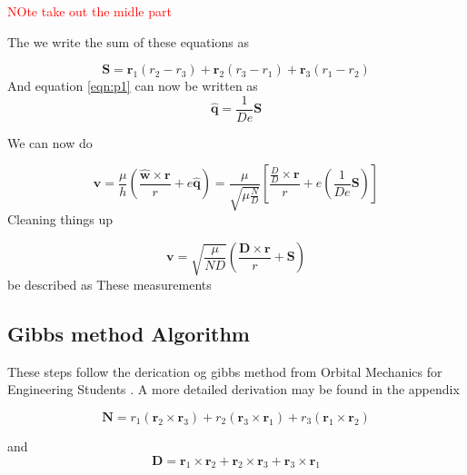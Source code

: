 \documentclass[12pt]{article}
\begin{document}
\textcolor{red}{	NOte take out the midle part}

The we write the sum of these equations as 

	\begin{equation}
	\mathbf { S } = \mathbf { r } _ { 1 } \left( r _ { 2 } - r _ { 3 } \right) + \mathbf { r } _ { 2 } \left( r _ { 3 } - r _ { 1 } \right) + \mathbf { r } _ { 3 } \left( r _ { 1 } - r _ { 2 } \right)
	\end{equation}
	And equation \ref{eqn:p1} can now be written as 
	\begin{equation}
	\hat { \mathbf { q } } = \frac { 1 } { D e } \mathbf { S }
	\end{equation}
	
	We can now do
	
	\begin{equation}
	\mathbf { v } = \frac { \mu } { h } \left( \frac { \hat { \mathbf { w } } \times \mathbf { r } } { r } + e \hat { \mathbf { q } } \right)=\frac { \mu } { \sqrt { \mu \frac { N } { D } } } \left[ \frac { \frac { D } { D } \times \mathbf { r } } { r } + e \left( \frac { 1 } { D e } \mathbf { S } \right) \right]
	\end{equation}
	Cleaning things up
	
	\begin{equation}
	\mathbf { v } = \sqrt { \frac { \mu } { N D } } \left( \frac { \mathbf { D } \times \mathbf { r } } { r } + \mathbf { S } \right)
	\end{equation}
	 be described as 
	These measurements 
	\iffalse
	\subsection{Gibbs method Algorithm}
	These steps follow the derication og gibbs method from Orbital Mechanics for Engineering Students \cite{curtis2013_gibbs}. A more detailed derivation may be found in the appendix
	
	\begin{equation}
	\mathbf { N } = r _ { 1 } \left( \mathbf { r } _ { 2 } \times \mathbf { r } _ { 3 } \right) + r _ { 2 } \left( \mathbf { r } _ { 3 } \times \mathbf { r } _ { 1 } \right) + r _ { 3 } \left( \mathbf { r } _ { 1 } \times \mathbf { r } _ { 2 } \right)
	\end{equation}
	
	and
	\begin{equation}
	\mathbf { D } = \mathbf { r } _ { 1 } \times \mathbf { r } _ { 2 } + \mathbf { r } _ { 2 } \times \mathbf { r } _ { 3 } + \mathbf { r } _ { 3 } \times \mathbf { r } _ { 1 }
	\end{equation}
	
\end{document}
